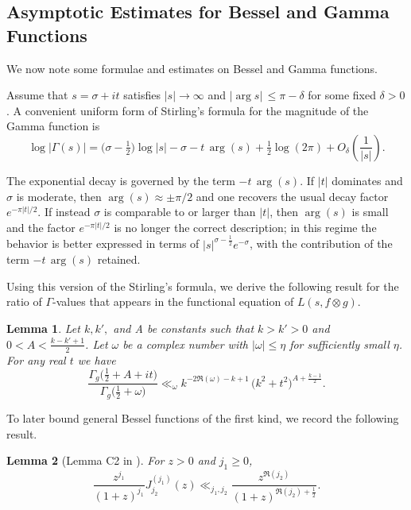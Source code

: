 \documentclass[12pt]{amsart}
\theoremstyle{plain}
\newtheorem{lem}{Lemma}[subsection]
\theoremstyle{definition}
\begin{document}

\subsection{Asymptotic Estimates for Bessel and Gamma Functions} We now note some formulae and estimates on Bessel and Gamma functions. 

Assume that $s=\sigma+it$ satisfies $|s|\to\infty$ and $|\arg s|\, \le \pi-\delta$ for some fixed $\delta>0$. A convenient uniform form of Stirling's formula for the magnitude of the Gamma function is
\begin{equation}\label{eqn: stirling-formula}
\log{|\Gamma(s)|}
=
\Big(\sigma-\tfrac12\Big)\log|s|
-\sigma
- t\,\arg(s)
+\tfrac12\log(2\pi)
+O_\delta\!\left(\frac1{|s|}\right).
\end{equation}

The exponential decay is governed by the term $-t\,\arg(s)$. If $|t|$ dominates and
$\sigma$ is moderate, then $\arg(s)\approx \pm \pi/2$ and one recovers the
usual decay factor $e^{-\pi|t|/2}$. If instead $\sigma$ is comparable to or larger
than $|t|$, then $\arg(s)$ is small and the factor $e^{-\pi|t|/2}$ is no longer the
correct description; in this regime the behavior is better expressed in terms of
$|s|^{\sigma-\frac12}e^{-\sigma}$, with the contribution of the term
$-t\,\arg(s)$ retained. 

Using this version of the Stirling's formula, we derive the following result for the ratio of $\Gamma$-values that appears in the functional equation of $L(s,f\otimes g)$.


\begin{lem}\label{lem:log derivative gamma g bound}
Let $k,k',$ and A be constants such that $k > k'>0$ and $0<A < \frac{k-k'+1}{2}$. Let $\omega$ be a complex number with $|\omega|\leq \eta$ for sufficiently small $\eta$. For any real $t$ we have
    \[
    \frac{\Gamma_g\big(\frac12+A+it\big) }{\Gamma_g\big(\frac12+\omega\big) }
    \ll_{\omega}
    k^{-2\Re(\omega)-k+1} \, \big(k^2+t^2\big)^{A+\frac{k-1}{2}}.
    \]
\end{lem}


To later bound general Bessel functions of the first kind, we record the following result.

\begin{lem}[Lemma C2 in \cite{KMV RS}]\label{lem:Bessel}
For $z>0$ and $j_1 \geq 0$, 
    \[
    \frac{z^{j_1}}{(1+z)^{j_1}}J^{(j_1)}_{j_2}(z) \ll_{j_1, j_2}
    \frac{z^{\Re(j_2)}}{(1+z)^{\Re(j_2)+\frac12}}. 
    \]
\end{lem}
\end{document}
